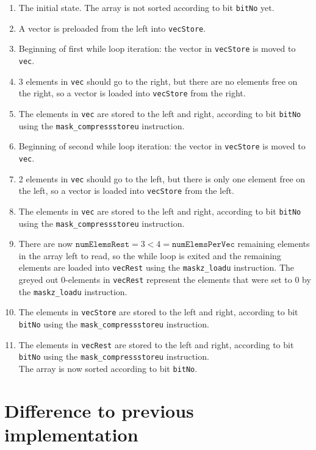 \documentclass[12pt, a4paper, openright, twoside]{tiarbeit}
\begin{document}
\begin{enumerate}[label=\arabic*)]
  \item The initial state. The array is not sorted according to bit
        \texttt{bitNo} yet.
  \item A vector is preloaded from the left into \texttt{vecStore}.
  \item Beginning of first while loop iteration: the vector in \texttt{vecStore}
        is moved to \texttt{vec}.
  \item 3 elements in \texttt{vec} should go to the right, but there are no elements free on the right,
        so a vector is loaded into \texttt{vecStore} from the right.
  \item The elements in \texttt{vec} are stored to the left and right, according to bit \texttt{bitNo}
        using the \texttt{mask\_compressstoreu} instruction.
  \item Beginning of second while loop iteration: the vector in \texttt{vecStore}
        is moved to \texttt{vec}.
  \item 2 elements in \texttt{vec} should go to the left, but there is only one element
        free on the left, so a vector is loaded into \texttt{vecStore} from the left.
  \item The elements in \texttt{vec} are stored to the left and right, according to bit \texttt{bitNo}
        using the \texttt{mask\_compressstoreu} instruction.
  \item There are now $\texttt{numElemsRest}=3<4=\texttt{numElemsPerVec}$ remaining elements in the
        array left to read, so the while loop is exited and the remaining elements are loaded into \texttt{vecRest}
        using the \texttt{maskz\_loadu} instruction. The greyed out 0-elements
        in \texttt{vecRest} represent the elements that were set to 0 by the \texttt{maskz\_loadu}
        instruction.
  \item The elements in \texttt{vecStore} are stored to the left and right, according to bit \texttt{bitNo}
        using the \texttt{mask\_compressstoreu} instruction.
  \item The elements in \texttt{vecRest} are stored to the left and right, according to bit \texttt{bitNo}
        using the \texttt{mask\_compressstoreu} instruction.\\
        The array is now sorted according to bit \texttt{bitNo}.
\end{enumerate}

\section{Difference to previous implementation}
\end{document}
